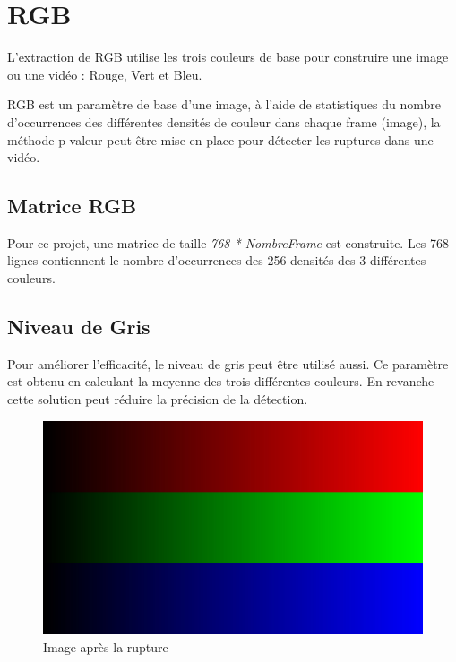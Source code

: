 \section{RGB}
L’extraction de RGB utilise les trois couleurs de base pour construire une image ou une vidéo : Rouge, Vert et Bleu.

RGB est un paramètre de base d’une image, à l’aide de statistiques du nombre d’occurrences des différentes densités de couleur dans chaque frame (image), la méthode p-valeur peut être mise en place pour détecter les ruptures dans une vidéo.

\subsection{Matrice RGB}

Pour ce projet, une matrice de taille \textit{768 * NombreFrame} est construite. Les 768 lignes contiennent le nombre d’occurrences des 256 densités des 3 différentes couleurs.

\subsection{Niveau de Gris}
Pour améliorer l’efficacité, le niveau de gris peut être utilisé aussi. Ce paramètre est obtenu en calculant la moyenne des trois différentes couleurs. En revanche cette solution peut réduire la précision de la détection.

\begin{figure}[h!]
      \centering
      \includegraphics[scale=0.12]{images/RGB.jpg}
      \caption{\label{Après} Image après la rupture}
\end{figure}



